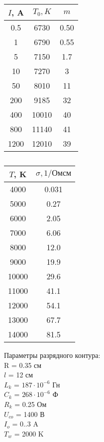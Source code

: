 \newpage
\begin{table}[ph!]\label{table_1}
	\caption{}
	\centering
	\begin{tabular}{|c|c|c|}
		\hline
		$I$, A & $T_0, K$& $m$\\
		\hline
		0.5 & 6730 & 0.50\\
		\hline
		1 & 6790 & 0.55 \\
		\hline
		5 & 7150 & 1.7 \\
		\hline
		10 & 7270 & 3 \\
		\hline
		50 & 8010 & 11 \\
		\hline
		200 & 9185 & 32 \\
		\hline
		400 & 10010 & 40 \\
		\hline
		800 & 11140 & 41 \\
		\hline
		1200 & 12010 & 39 \\
		\hline
	\end{tabular}
\end{table}

\begin{table}[ph!]\label{table_2}
	\caption{}
	\centering
	\begin{tabular}{|c|c|}
		\hline
		$T$, K & $\sigma, 1/Ом см$\\
		\hline
		4000 & 0.031 \\
		\hline
		5000 & 0.27 \\
		\hline
		6000 & 2.05 \\
		\hline
		7000 & 6.06 \\
		\hline
		8000 & 12.0 \\
		\hline
		9000 & 19.9 \\
		\hline
		10000 & 29.6 \\
		\hline
		11000 & 41.1 \\
		\hline
		12000 & 54.1 \\
		\hline
		13000 & 67.7 \\
		\hline
		14000 & 81.5 \\
		\hline
	\end{tabular}
\end{table}

Параметры разрядного контура: \\
R = 0.35 см \\
$l$ = 12 см \\
$L_k$ = $187 \cdot 10^{-6}$ Гн \\
$C_k$ = $268 \cdot 10^{-6}$ Ф \\
$R_k$ = 0.25 Ом \\
$U_{co}$ = 1400 В \\
$I_o$ = 0..3 A \\
$T_w$ = 2000 K\\